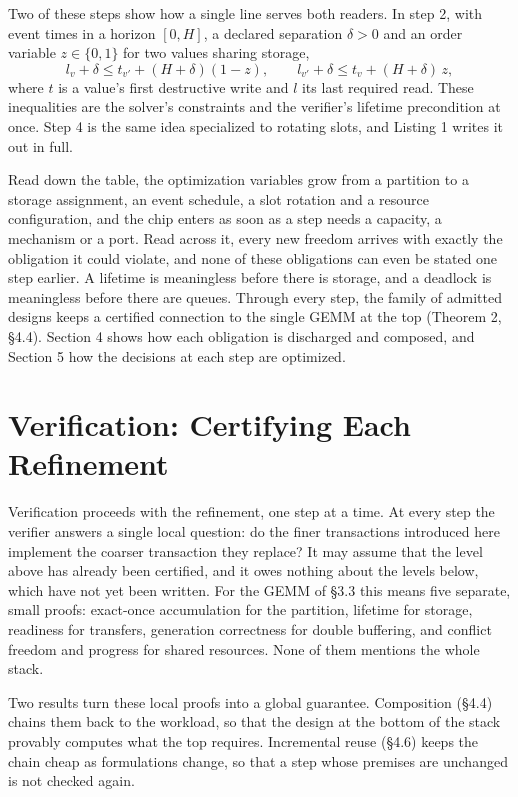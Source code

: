 \documentclass[11pt]{article}
\begin{document}
Two of these steps show how a single line serves both readers. In step 2, with event times in a horizon \([0,H]\), a declared separation \(\delta>0\) and an order variable \(z\in\{0,1\}\) for two values sharing storage,
\[
l_v+\delta\le t_{v'}+(H+\delta)(1-z),\qquad l_{v'}+\delta\le t_v+(H+\delta)\,z,
\]
where \(t\) is a value's first destructive write and \(l\) its last required read. These inequalities are the solver's constraints and the verifier's lifetime precondition at once. Step 4 is the same idea specialized to rotating slots, and Listing 1 writes it out in full.

Read down the table, the optimization variables grow from a partition to a storage assignment, an event schedule, a slot rotation and a resource configuration, and the chip enters as soon as a step needs a capacity, a mechanism or a port. Read across it, every new freedom arrives with exactly the obligation it could violate, and none of these obligations can even be stated one step earlier. A lifetime is meaningless before there is storage, and a deadlock is meaningless before there are queues. Through every step, the family of admitted designs keeps a certified connection to the single GEMM at the top (Theorem 2, §4.4). Section 4 shows how each obligation is discharged and composed, and Section 5 how the decisions at each step are optimized.

\hypertarget{verification-certifying-each-refinement}{%
\section{Verification: Certifying Each Refinement}\label{verification-certifying-each-refinement}}

Verification proceeds with the refinement, one step at a time. At every step the verifier answers a single local question: do the finer transactions introduced here implement the coarser transaction they replace? It may assume that the level above has already been certified, and it owes nothing about the levels below, which have not yet been written. For the GEMM of §3.3 this means five separate, small proofs: exact-once accumulation for the partition, lifetime for storage, readiness for transfers, generation correctness for double buffering, and conflict freedom and progress for shared resources. None of them mentions the whole stack.

Two results turn these local proofs into a global guarantee. Composition (§4.4) chains them back to the workload, so that the design at the bottom of the stack provably computes what the top requires. Incremental reuse (§4.6) keeps the chain cheap as formulations change, so that a step whose premises are unchanged is not checked again.
\end{document}

